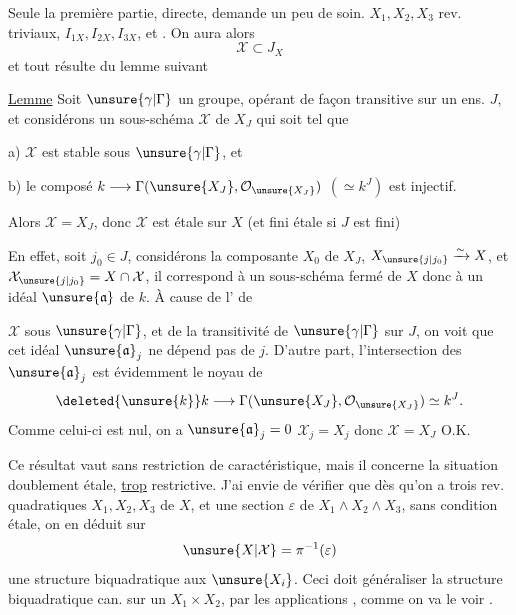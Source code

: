  Seule la première partie, directe, demande un peu de soin.  $X_1,X_2,X_3$ rev. triviaux, $I_{1X},I_{2X},I_{3X}$, et  .  On aura alors
\[
 \mathcal X\subset J_X
\]
et tout résulte du lemme suivant

\uline{Lemme} Soit $\unsure{\gamma|\Gamma}$ un groupe, opérant de façon transitive sur un ens. $J$, et considérons un sous-schéma $\mathcal X$ de $X_J$  qui soit tel que

a) $\mathcal X$ est stable sous $\unsure{\gamma|\Gamma}$, et

b) le composé $k\longrightarrow\Gamma(\unsure{X_J},\mathcal O_{\unsure{X_J}})$ $(\simeq k^J)$ est injectif.

Alors $\mathcal X=X_J$, donc $\mathcal X$ est étale sur $X$ (et fini étale si $J$ est fini)

En effet, soit $j_0\in J$, considérons la composante $X_0$ de $X_J$, $X_{\unsure{j|j_0}}\xrightarrow{\sim}X$, et $\mathcal X_{\unsure{j|j_0}}=X\cap\mathcal X$, il correspond à un sous-schéma fermé de $X$ donc à un idéal $\unsure{\mathfrak a}$ de $k$. À cause de l' de

$\mathcal X$ sous $\unsure{\gamma|\Gamma}$, et de la transitivité de $\unsure{\gamma|\Gamma}$ sur $J$, on voit que cet idéal $\unsure{\mathfrak a}_j$ ne dépend pas de $j$. D'autre part, l'intersection des $\unsure{\mathfrak a}_j$ est évidemment le noyau de
\[
 \deleted{\unsure{k}}k\longrightarrow\Gamma(\unsure{X_J},\mathcal O_{\unsure{X_J}})\simeq k^J.
\]
Comme celui-ci est nul, on a $\unsure{\mathfrak a}_j=0$  $\mathcal X_j=X_j$ donc $\mathcal X=X_J$ O.K.

Ce résultat vaut sans restriction de caractéristique, mais il concerne la situation doublement étale, \uline{trop} restrictive. J'ai envie de vérifier que dès qu'on a trois rev. quadratiques $X_1,X_2,X_3$ de $X$, et une section $\varepsilon$ de $X_1\wedge X_2\wedge X_3$, sans condition étale, on en déduit sur
\[
 \unsure{X|\mathcal X}=\pi^{-1}(\varepsilon)
\]
une structure biquadratique  aux $\unsure{X_i}$. Ceci doit généraliser la structure biquadratique can. sur un $X_1\times X_2$, par les applications
,
comme on va le voir .

